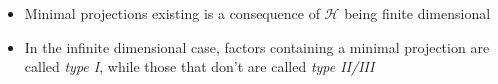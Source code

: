 \documentclass[12pt,a4paper]{article}
\numberwithin{equation}{section}
\theoremstyle{definition}
\theoremstyle{theorem}
\newtheorem{theorem}{Theorem}[section]
\begin{document}
\begin{itemize}
		\begin{theorem}
			Suppose $M$ is a von Neumann algebra on $\mathcal{H}$, and $p$ is a minimal projection. Then $pMp=\mathbb{C}p$.
		\end{theorem}
		\begin{proof}
			$pMp$ always contains $\mathbb{C}p$ trivially. If it contains any other operators, then by prop. 1 it has a non-trivial projection $q$. But such a $q$ contradicts $p$ being minimal. 
		\end{proof}
		\item Minimal projections existing is a consequence of $\mathcal{H}$ being finite dimensional
		\item In the infinite dimensional case, factors containing a minimal projection are called \textit{type I}, while those that don't are called \textit{type II/III}
	\end{itemize}
\end{document}
